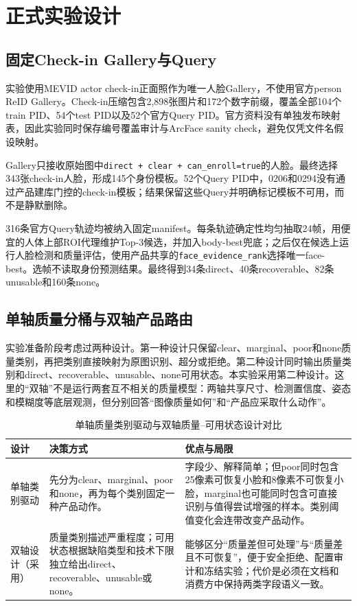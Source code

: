 \documentclass[UTF8,a4paper,11pt]{ctexart}
\begin{document}
\section{正式实验设计}

\subsection{固定Check-in Gallery与Query}

实验使用MEVID actor check-in正面照作为唯一人脸Gallery，不使用官方person ReID Gallery。Check-in压缩包含2,898张图片和172个数字前缀，覆盖全部104个train PID、54个test PID以及52个官方Query PID。官方资料没有单独发布映射表，因此实验同时保存编号覆盖审计与ArcFace sanity check，避免仅凭文件名假设映射。

Gallery只接收原始图中\texttt{direct + clear + can\_enroll=true}的人脸。最终选择343张check-in人脸，形成145个身份模板。52个Query PID中，0206和0294没有通过产品建库门控的check-in模板；结果保留这些Query并明确标记模板不可用，而不是静默删除。

316条官方Query轨迹均被纳入固定manifest。每条轨迹确定性均匀抽取24帧，用便宜的人体上部ROI代理维护Top-3候选，并加入body-best兜底；之后仅在候选上运行人脸检测和质量评估，使用产品共享的\texttt{face\_evidence\_rank}选择唯一face-best。选帧不读取身份预测结果。最终得到34条direct、40条recoverable、82条unusable和160条none。

\subsection{单轴质量分桶与双轴产品路由}

实验准备阶段考虑过两种设计。第一种设计只保留clear、marginal、poor和none质量类别，再把类别直接映射为原图识别、超分或拒绝。第二种设计同时输出质量类别和direct、recoverable、unusable、none可用状态。本实验采用第二种设计。这里的``双轴''不是运行两套互不相关的质量模型：两轴共享尺寸、检测置信度、姿态和模糊度等底层观测，但分别回答``图像质量如何''和``产品应采取什么动作''。

\begin{table}[H]
\centering
\caption{单轴质量类别驱动与双轴质量--可用状态设计对比}
\label{tab:quality-routing}
\renewcommand{\arraystretch}{1.18}
\begin{tabular}{p{}p{}p{}}
\toprule
设计 & 决策方式 & 优点与局限\\
\midrule
单轴类别驱动 &
先分为clear、marginal、poor和none，再为每个类别固定一种产品动作。 &
字段少、解释简单；但poor同时包含25像素可恢复小脸和8像素不可恢复小脸，marginal也可能同时包含可直接识别与值得尝试增强的样本。类别阈值变化会连带改变产品动作。\\
\addlinespace
双轴设计（采用） &
质量类别描述严重程度；可用状态根据缺陷类型和技术下限独立给出direct、recoverable、unusable或none。 &
能够区分``质量差但可处理''与``质量差且不可恢复''，便于安全拒绝、配置审计和冻结实验；代价是必须在文档和消费方中保持两类字段语义一致。\\
\bottomrule
\end{tabular}
\end{table}
\end{document}
